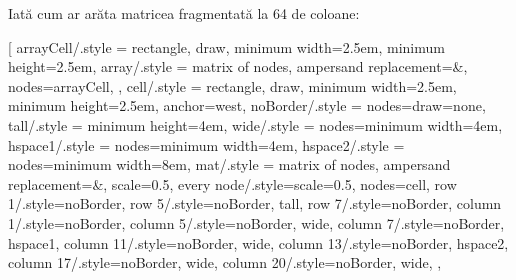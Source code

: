 Iată cum ar arăta matricea fragmentată la 64 de coloane:

\centeredTikzFigure[
  arrayCell/.style = {rectangle, draw, minimum width=2.5em, minimum height=2.5em},
  array/.style = {
    matrix of nodes,
    ampersand replacement=\&,
    nodes=arrayCell,
  },
  cell/.style = {rectangle, draw, minimum width=2.5em, minimum height=2.5em, anchor=west},
  noBorder/.style = {nodes={draw=none}},
  tall/.style = {minimum height=4em},
  wide/.style = {nodes={minimum width=4em}},
  hspace1/.style = {nodes={minimum width=4em}},
  hspace2/.style = {nodes={minimum width=8em}},
  mat/.style = {
    matrix of nodes,
    ampersand replacement=\&,
    scale=0.5,
    every node/.style={scale=0.5},
    nodes=cell,
    row 1/.style=noBorder,
    row 5/.style={noBorder, tall},
    row 7/.style=noBorder,
    column 1/.style=noBorder,
    column 5/.style={noBorder, wide},
    column 7/.style={noBorder, hspace1},
    column 11/.style={noBorder, wide},
    column 13/.style={noBorder, hspace2},
    column 17/.style={noBorder, wide},
    column 20/.style={noBorder, wide},
  },
